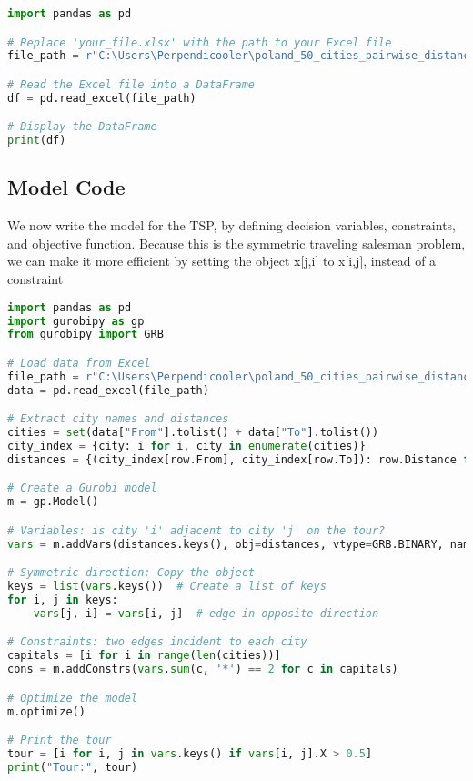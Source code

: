 \begin{lstlisting}[language=Python, caption={Data Computation}]
import pandas as pd

# Replace 'your_file.xlsx' with the path to your Excel file
file_path = r"C:\Users\Perpendicooler\poland_50_cities_pairwise_distances.xlsx"

# Read the Excel file into a DataFrame
df = pd.read_excel(file_path)

# Display the DataFrame
print(df)
\end{lstlisting}
\subsection*{Model Code}
We now write the model for the TSP, by defining decision variables, constraints, and objective function. Because this is the symmetric traveling salesman problem, we can make it more efficient by setting the object x[j,i] to x[i,j], instead of a constraint
\begin{center}
    \begin{lstlisting}[language=Python, caption={Optimize the Model}]
    import pandas as pd
import gurobipy as gp
from gurobipy import GRB

# Load data from Excel
file_path = r"C:\Users\Perpendicooler\poland_50_cities_pairwise_distances.xlsx"
data = pd.read_excel(file_path)

# Extract city names and distances
cities = set(data["From"].tolist() + data["To"].tolist())
city_index = {city: i for i, city in enumerate(cities)}
distances = {(city_index[row.From], city_index[row.To]): row.Distance for row in data.itertuples()}

# Create a Gurobi model
m = gp.Model()

# Variables: is city 'i' adjacent to city 'j' on the tour?
vars = m.addVars(distances.keys(), obj=distances, vtype=GRB.BINARY, name='x')

# Symmetric direction: Copy the object
keys = list(vars.keys())  # Create a list of keys
for i, j in keys:
    vars[j, i] = vars[i, j]  # edge in opposite direction

# Constraints: two edges incident to each city
capitals = [i for i in range(len(cities))]
cons = m.addConstrs(vars.sum(c, '*') == 2 for c in capitals)

# Optimize the model
m.optimize()

# Print the tour
tour = [i for i, j in vars.keys() if vars[i, j].X > 0.5]
print("Tour:", tour)

        
    \end{lstlisting}
\end{center}

